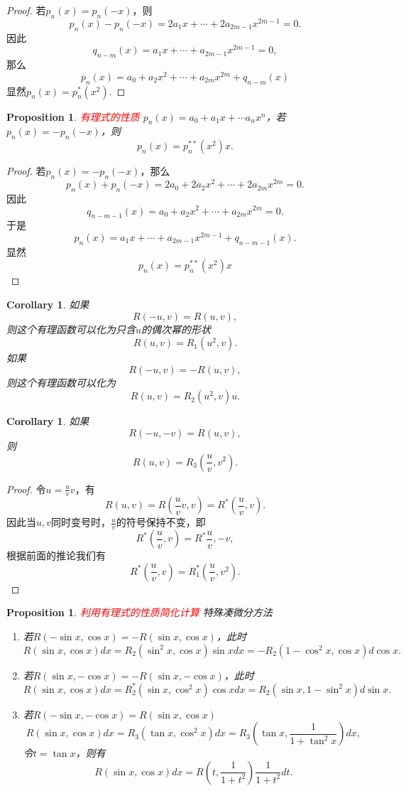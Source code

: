 \documentclass{article}
\newtheorem{corollary}[theorem]{Corollary}
\newtheorem{proposition}[theorem]{Proposition}
\newcommand{\redt}[1]{\textcolor{red}{#1}}
\begin{document}
\begin{proof}
若$p_n(x) = p_n(-x)$，则
$$
p_n(x) - p_n(-x) = 2a_1x + \cdots + 2a_{2m-1}x^{2m-1} = 0.
$$
因此
$$
q_{n-m}(x) = a_1x + \cdots + a_{2m-1}x^{2m-1} = 0,
$$
那么
$$
p_n(x) = a_0 + a_2x^{2} + \cdots + a_{2m}x^{2m}  + q_{n-m}(x)
$$
显然$p_n(x) = p_n^*(x^2)$. 
\end{proof}

\begin{proposition}
\rm  \redt{有理式的性质} $p_n(x)=a_0 + a_1x + \cdots a_{n}x^n$，若$p_n(x) = -p_n(-x)$，则
$$
p_n(x) = p_n^{**}(x^2)x.
$$
\end{proposition}

\begin{proof}
若$p_n(x) = -p_n(-x)$，那么
$$
p_n(x) + p_n(-x) = 2a_0 + 2a_2x^{2} +\cdots + 2a_{2m}x^{2m} = 0.
$$
因此
$$
q_{n-m-1}(x) = a_0 + a_2x^2 + \cdots +a_{2m}x^{2m}=0.
$$
于是
$$
p_n(x) = a_1x + \cdots + a_{2m-1}x^{2m-1} + q_{n-m-1}(x).  
$$
显然
$$
p_n(x) = p_n^{**}(x^2)x
$$
\end{proof}

\begin{corollary}
\rm 如果
$$
R(-u,v) = R(u,v),
$$
则这个有理函数可以化为只含$u$的偶次幂的形状
$$
R(u,v) = R_1(u^2,v).
$$
如果
$$
R(-u,v) = -R(u,v),
$$
则这个有理函数可以化为
$$
R(u,v) = R_2(u^2,v)u.
$$
\end{corollary}

\begin{corollary}
\rm 如果
$$
R(-u,-v) = R(u,v),
$$
则
$$
R(u,v) = R_3(\frac{u}{v},v^2).
$$
\end{corollary}

\begin{proof}
令$u = \frac{u}{v}v$，有
$$
R(u,v) = R(\frac{u}{v}v,v) = R^*(\frac{u}{v},v).
$$
因此当$u,v$同时变号时，$\frac{u}{v}$的符号保持不变，即
$$
R^*(\frac{u}{v},v) = R^*{\frac{u}{v},-v},
$$
根据前面的推论我们有
$$
R^*(\frac{u}{v},v) = R_1^*(\frac{u}{v},v^2).  
$$
\end{proof}

\begin{proposition}
\rm \redt{利用有理式的性质简化计算} 特殊凑微分方法
\begin{enumerate}
	\item 若$R(-\sin x,\cos x) = - R(\sin x, \cos x)$，此时
	$$
	R(\sin x,\cos x)dx = R_2(\sin^2 x, \cos x)\sin x dx = -R_2(1-\cos^2x,\cos x)d\cos x.
	$$
	\item 若$R(\sin x,-\cos x) = - R(\sin x, -\cos x)$，此时
	$$
	R(\sin x,\cos x)dx = R_2^*(\sin x, \cos^2x )\cos x dx = R_2(\sin x , 1-\sin^2 x)d\sin x.
	$$
	\item 若$R(-\sin x, -\cos x) = R(\sin x ,\cos x)$ 
	$$
	R(\sin x, \cos x)dx = R_3(\tan x,\cos^2 x)dx = R_3(\tan x, \frac{1}{1+\tan^2 x})dx,
	$$
	令$t = \tan x$，则有
	$$
	R(\sin x, \cos x)dx = R\left(t,\frac{1}{1+t^2}\right)\frac{1}{1+t^2}dt. 
	$$
\end{enumerate}
\end{proposition}
\end{document}
